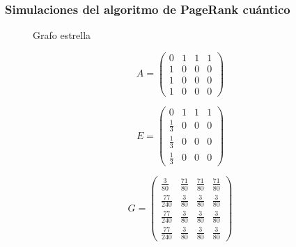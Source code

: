 \documentclass[xetex,mathserif,serif]{beamer}
\begin{document}
\begin{frame}
    \frametitle{Simulaciones del algoritmo de PageRank cuántico}


\begin{figure}[H]
    \centering
    \caption[Grafo estrella]{Grafo estrella}
    \label{fig:star}
\end{figure}

\begin{equation}
    A =
    \begin{pmatrix}
        0 & 1 & 1 & 1 \\
        1 & 0 & 0 & 0 \\
        1 & 0 & 0 & 0 \\
        1 & 0 & 0 & 0
    \end{pmatrix}
\end{equation}

\begin{equation}
    E = 
    \begin{pmatrix}
        0 & 1 & 1 & 1 \\
        \frac{1}{3} & 0 & 0 & 0 \\
        \frac{1}{3} & 0 & 0 & 0 \\
        \frac{1}{3} & 0 & 0 & 0
    \end{pmatrix}
\end{equation}

\begin{equation}
    G =
    \begin{pmatrix}
        \frac{3}{80} & \frac{71}{80} & \frac{71}{80} & \frac{71}{80} \\
        \frac{77}{240} & \frac{3}{80} & \frac{3}{80} & \frac{3}{80} \\
        \frac{77}{240} & \frac{3}{80} & \frac{3}{80} & \frac{3}{80} \\
        \frac{77}{240} & \frac{3}{80} & \frac{3}{80} & \frac{3}{80}
    \end{pmatrix}
\end{equation}


\end{frame}
\end{document}
